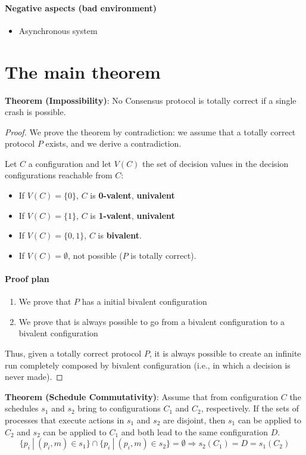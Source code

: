 \documentclass[12pt]{article}
\newcommand{\BI}{\begin{itemize}}
\newcommand{\EI}{\end{itemize}}
\newcommand{\BE}{\begin{enumerate}}
\newcommand{\EE}{\end{enumerate}}
\newenvironment{theorem}[1]{\textbf{Theorem (#1)}: }{\medskip}
\newenvironment{lemma}[1]{\textbf{Theorem (#1)}: }{\medskip}
\begin{document}
\paragraph*{Negative aspects (bad environment)}
\BI
\item Asynchronous system
\EI

\section*{The main theorem}

\begin{theorem}{Impossibility}
No Consensus protocol is totally correct if a single crash is possible.
\end{theorem}

\begin{proof}
We prove the theorem by contradiction: we assume that a totally correct 
protocol $P$ exists, and we derive a contradiction.

Let $C$ a configuration and let $V(C)$ the set of decision values in
the decision configurations reachable from $C$:
\BI
\item If $V(C) = \{ 0 \}$, $C$ is {\bf 0-valent}, {\bf univalent}
\item If $V(C) = \{ 1 \}$, $C$ is {\bf 1-valent}, {\bf univalent}
\item If $V(C) = \{ 0,1 \}$, $C$ is {\bf bivalent}.
\item If $V(C) = \emptyset$, not possible ($P$ is totally correct).
\EI

\paragraph{Proof plan}

\BE
\item We prove that $P$ has a initial bivalent configuration
\item We prove that is always possible to go from a bivalent configuration to 
  a bivalent configuration
\EE
Thus, given a totally correct protocol $P$, it is always possible to 
create an infinite run completely composed by bivalent configuration
(i.e., in which a decision is never made).

\end{proof}


\begin{lemma}{Schedule Commutativity}	
Assume that from configuration $C$ the schedules
$s_1$ and $s_2$ bring to configurations $C_1$ and $C_2$,
respectively. If the sets of processes that execute actions in
$s_1$ and $s_2$ are disjoint, then $s_1$ can be applied to $C_2$
and $s_2$ can be applied to $C_1$ and both lead to the same configuration
$D$.
\[
  \{ p_i ~|~ (p_i, m) \in s_1 \} \cap \{ p_i ~|~ (p_i, m) \in s_2 \} = \emptyset \Rightarrow s_2(C_1) = D = s_1(C_2)
\]
\end{lemma}
\end{document}
